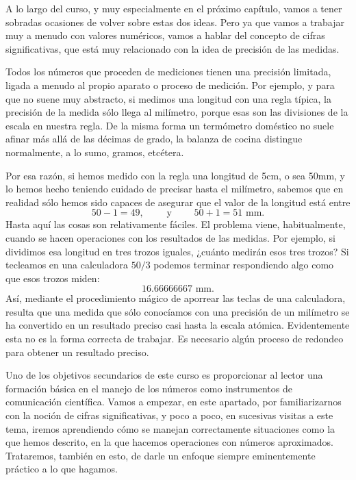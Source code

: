 A lo largo del curso, y muy especialmente en el próximo capítulo, vamos a tener sobradas ocasiones de volver sobre estas dos ideas. Pero ya que
vamos a trabajar muy a menudo con valores numéricos, vamos a hablar del concepto de {\sf cifras significativas}, que está
muy relacionado con la idea de precisión de las medidas.

Todos los números que proceden de mediciones tienen una precisión limitada, ligada a menudo al propio aparato o proceso de medición. Por ejemplo, y
para que no suene muy abstracto, si medimos una longitud con una regla típica, la precisión de la medida sólo llega al milímetro, porque esas son las
divisiones de la escala en nuestra regla. De la misma forma un termómetro doméstico no suele afinar más allá de las décimas de grado, la balanza de
cocina distingue normalmente, a lo sumo, gramos, etcétera.

Por esa razón, si hemos medido con la regla una longitud de 5cm, o sea 50mm, y lo hemos hecho teniendo cuidado de precisar hasta el milímetro, sabemos
que en realidad sólo hemos sido capaces de asegurar que el valor de la longitud está entre
\[50-1=49,\qquad\mbox{ y }\qquad 50+1=51\mbox{ mm.}\]
Hasta aquí las cosas son relativamente fáciles. El problema viene, habitualmente, cuando se hacen operaciones con los resultados de las medidas. Por
ejemplo, si dividimos esa longitud en tres trozos iguales, ¿cuánto medirán esos tres trozos? Si tecleamos en una calculadora $50/3$ podemos terminar
respondiendo algo como que esos trozos miden:
\[16.66666667\mbox{ mm.}\]
Así, mediante el procedimiento mágico de aporrear las teclas de una calculadora, resulta que una medida que sólo conocíamos con una precisión de un
milímetro se ha convertido en un resultado preciso casi hasta la escala atómica. Evidentemente esta no es la forma correcta de trabajar. Es necesario
algún proceso de {\sf redondeo} para obtener un resultado preciso.

Uno de los objetivos secundarios de este curso es proporcionar al lector una formación básica en el manejo de los números como instrumentos de
comunicación científica. Vamos a empezar, en este apartado, por familiarizarnos con la noción de cifras significativas, y poco a poco, en sucesivas
visitas a este tema, iremos aprendiendo cómo se manejan correctamente situaciones como la que hemos descrito, en la que hacemos operaciones con
números aproximados. Trataremos, también en esto, de darle un enfoque siempre eminentemente práctico a lo que hagamos.

